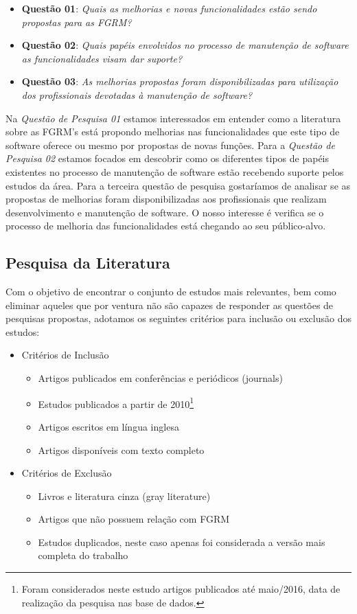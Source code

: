 \begin{itemize}
	\item \textbf{Questão 01}: \textit{Quais as melhorias e novas
			funcionalidades estão sendo propostas para as FGRM?}
   	\item \textbf{Questão 02}: \textit{Quais papéis 
			envolvidos no processo de manutenção de software as funcionalidades visam
			dar suporte?}
	\item \textbf{Questão 03}: \textit{As melhorias propostas foram
			disponibilizadas para utilização dos profissionais devotadas à
			manutenção de software?}
\end{itemize}


Na \textit{Questão de Pesquisa 01} estamos interessados em entender como a
literatura sobre as FGRM's está propondo melhorias nas funcionalidades que este
tipo de software oferece ou mesmo por propostas de novas funções. Para
a \textit{Questão de Pesquisa 02} estamos focados em descobrir como os diferentes
tipos de papéis existentes no processo de manutenção de software estão
recebendo suporte pelos estudos da área. Para a terceira questão de pesquisa
gostaríamos de analisar se as propostas de melhorias foram disponibilizadas aos
profissionais que realizam desenvolvimento e manutenção de software. O nosso
interesse é verifica se o processo de melhoria das funcionalidades está chegando
ao seu público-alvo.

\subsection{Pesquisa da Literatura}
\label{subsec:map-pesquisa-literatura}

Com o objetivo de encontrar o conjunto de estudos mais relevantes, bem como
eliminar aqueles que por ventura não são capazes de responder as questões de
pesquisas propostas, adotamos os seguintes critérios para inclusão ou exclusão
dos estudos:

\begin{itemize}
	\item Critérios de Inclusão
		\begin{itemize}
			\item Artigos
				publicados em conferências e periódicos (journals)
			\item Estudos
				publicados a partir de 2010\footnote{Foram considerados neste
					estudo artigos publicados até maio/2016, data de realização
					da pesquisa nas base de dados.}
			\item Artigos escritos em
				língua inglesa
			\item Artigos disponíveis com texto
				completo
		\end{itemize}
	\item Critérios de Exclusão
		\begin{itemize}
			\item Livros e literatura cinza (gray literature)
			\item Artigos que não possuem relação com FGRM
			\item Estudos duplicados, neste caso apenas foi considerada a versão mais
				completa do trabalho
		\end{itemize}
\end{itemize}

